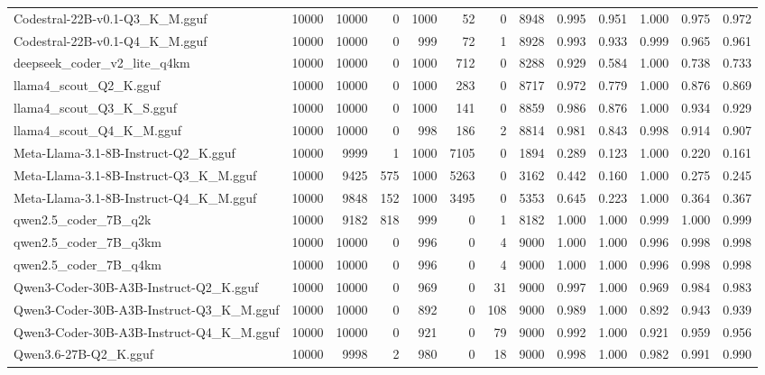 \begin{table}[htbp]
{\begin{tabular}{lrrrrrrrrrrrr}
    Codestral-22B-v0.1-Q3\_K\_M.gguf & 10000 & 10000 & 0 & 1000 & 52 & 0 & 8948 & 0.995 & 0.951 & 1.000 & 0.975 & 0.972 \\
    Codestral-22B-v0.1-Q4\_K\_M.gguf & 10000 & 10000 & 0 & 999 & 72 & 1 & 8928 & 0.993 & 0.933 & 0.999 & 0.965 & 0.961 \\
    deepseek\_coder\_v2\_lite\_q4km & 10000 & 10000 & 0 & 1000 & 712 & 0 & 8288 & 0.929 & 0.584 & 1.000 & 0.738 & 0.733 \\
    llama4\_scout\_Q2\_K.gguf & 10000 & 10000 & 0 & 1000 & 283 & 0 & 8717 & 0.972 & 0.779 & 1.000 & 0.876 & 0.869 \\
    llama4\_scout\_Q3\_K\_S.gguf & 10000 & 10000 & 0 & 1000 & 141 & 0 & 8859 & 0.986 & 0.876 & 1.000 & 0.934 & 0.929 \\
    llama4\_scout\_Q4\_K\_M.gguf & 10000 & 10000 & 0 & 998 & 186 & 2 & 8814 & 0.981 & 0.843 & 0.998 & 0.914 & 0.907 \\
    Meta-Llama-3.1-8B-Instruct-Q2\_K.gguf & 10000 & 9999 & 1 & 1000 & 7105 & 0 & 1894 & 0.289 & 0.123 & 1.000 & 0.220 & 0.161 \\
    Meta-Llama-3.1-8B-Instruct-Q3\_K\_M.gguf & 10000 & 9425 & 575 & 1000 & 5263 & 0 & 3162 & 0.442 & 0.160 & 1.000 & 0.275 & 0.245 \\
    Meta-Llama-3.1-8B-Instruct-Q4\_K\_M.gguf & 10000 & 9848 & 152 & 1000 & 3495 & 0 & 5353 & 0.645 & 0.223 & 1.000 & 0.364 & 0.367 \\
    qwen2.5\_coder\_7B\_q2k & 10000 & 9182 & 818 & 999 & 0 & 1 & 8182 & 1.000 & 1.000 & 0.999 & 1.000 & \cellcolor{green!50}0.999 \\
    qwen2.5\_coder\_7B\_q3km & 10000 & 10000 & 0 & 996 & 0 & 4 & 9000 & 1.000 & 1.000 & 0.996 & 0.998 & \cellcolor{green!30}0.998 \\
    qwen2.5\_coder\_7B\_q4km & 10000 & 10000 & 0 & 996 & 0 & 4 & 9000 & 1.000 & 1.000 & 0.996 & 0.998 & \cellcolor{green!20}0.998 \\
    Qwen3-Coder-30B-A3B-Instruct-Q2\_K.gguf & 10000 & 10000 & 0 & 969 & 0 & 31 & 9000 & 0.997 & 1.000 & 0.969 & 0.984 & 0.983 \\
    Qwen3-Coder-30B-A3B-Instruct-Q3\_K\_M.gguf & 10000 & 10000 & 0 & 892 & 0 & 108 & 9000 & 0.989 & 1.000 & 0.892 & 0.943 & 0.939 \\
    Qwen3-Coder-30B-A3B-Instruct-Q4\_K\_M.gguf & 10000 & 10000 & 0 & 921 & 0 & 79 & 9000 & 0.992 & 1.000 & 0.921 & 0.959 & 0.956 \\
    Qwen3.6-27B-Q2\_K.gguf & 10000 & 9998 & 2 & 980 & 0 & 18 & 9000 & 0.998 & 1.000 & 0.982 & 0.991 & \cellcolor{green!10}0.990 \\

\end{tabular}}
\end{table}
